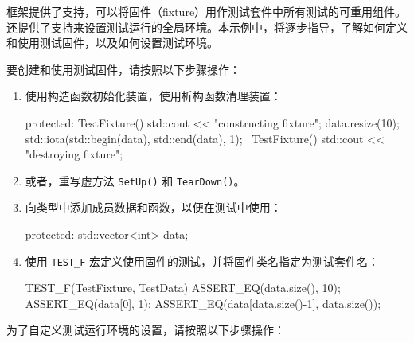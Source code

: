 
框架提供了支持，可以将固件（fixture）用作测试套件中所有测试的可重用组件。还提供了支持来设置测试运行的全局环境。本示例中，将逐步指导，了解如何定义和使用测试固件，以及如何设置测试环境。


要创建和使用测试固件，请按照以下步骤操作：

\begin{enumerate}
创建一个派生自 \verb|testing::Test|的类型：

\begin{cpp}
class TestFixture : public testing::Test
{
};
\end{cpp}

\item
使用构造函数初始化装置，使用析构函数清理装置：

\begin{cpp}
protected:
    TestFixture()
    {
        std::cout << "constructing fixture\n";
        data.resize(10);
        std::iota(std::begin(data), std::end(data), 1);
    }
    ~TestFixture()
    {
        std::cout << "destroying fixture\n";
    }
\end{cpp}

\item
或者，重写虚方法 \verb|SetUp()| 和 \verb|TearDown()|。

\item
向类型中添加成员数据和函数，以便在测试中使用：

\begin{cpp}
protected:
    std::vector<int> data;
\end{cpp}

\item
使用 \verb|TEST_F| 宏定义使用固件的测试，并将固件类名指定为测试套件名：

\begin{cpp}
TEST_F(TestFixture, TestData)
{
    ASSERT_EQ(data.size(), 10);
    ASSERT_EQ(data[0], 1);
    ASSERT_EQ(data[data.size()-1], data.size());
}
\end{cpp}
\end{enumerate}

为了自定义测试运行环境的设置，请按照以下步骤操作：

